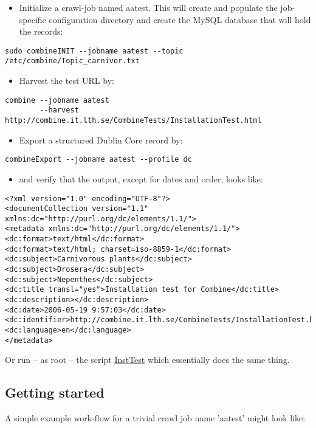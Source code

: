 \begin{itemize}
\item Initialize a crawl-job named aatest. This will create and populate
the job-specific configuration directory and create the MySQL database
that will hold the records:
\end{itemize}
\begin{verbatim}
sudo combineINIT --jobname aatest --topic /etc/combine/Topic_carnivor.txt 
\end{verbatim}
\begin{itemize}
\item Harvest the test URL by:
\end{itemize}
\begin{verbatim}
combine --jobname aatest
        --harvest http://combine.it.lth.se/CombineTests/InstallationTest.html
\end{verbatim}
\begin{itemize}
\item Export a structured Dublin Core record by:
\end{itemize}
\begin{verbatim}
combineExport --jobname aatest --profile dc
\end{verbatim}
\begin{itemize}
\item and verify that the output, except for dates and order, looks like:
\end{itemize}
\begin{verbatim}
<?xml version="1.0" encoding="UTF-8"?>
<documentCollection version="1.1" xmlns:dc="http://purl.org/dc/elements/1.1/">
<metadata xmlns:dc="http://purl.org/dc/elements/1.1/">
<dc:format>text/html</dc:format>
<dc:format>text/html; charset=iso-8859-1</dc:format>
<dc:subject>Carnivorous plants</dc:subject>
<dc:subject>Drosera</dc:subject>
<dc:subject>Nepenthes</dc:subject>
<dc:title transl="yes">Installation test for Combine</dc:title>
<dc:description></dc:description>
<dc:date>2006-05-19 9:57:03</dc:date>
<dc:identifier>http://combine.it.lth.se/CombineTests/InstallationTest.html</dc:identifier>
<dc:language>en</dc:language>
</metadata>
\end{verbatim}

Or run -- as root -- the script
\hyperref{{\tt ./doc/InstallationTest.pl}}{{\tt ./doc/InstallationTest.pl} (see }{ in the Appendix)}{InstTest}
which essentially does the same thing.


\subsection{Getting started}
\label{gettingstarted}
A simple example work-flow for a trivial crawl job name 'aatest' might look like:


